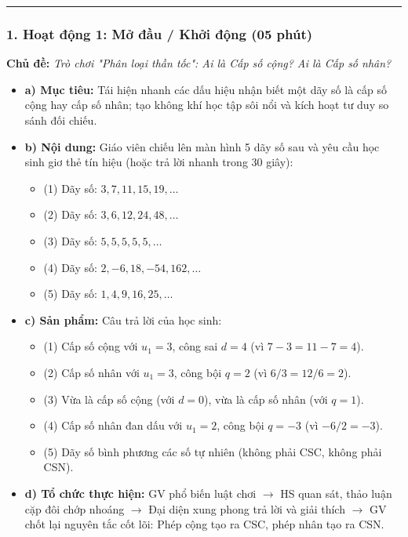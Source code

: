 \documentclass[12pt, a4paper]{article}
\begin{document}
\vspace{0.8em}
\hrule
\vspace{0.8em}

\subsubsection*{1. Hoạt động 1: Mở đầu / Khởi động (05 phút)}
\textbf{Chủ đề:} \textit{Trò chơi "Phân loại thần tốc": Ai là Cấp số cộng? Ai là Cấp số nhân?}
\begin{itemize}
    \item \textbf{a) Mục tiêu:} Tái hiện nhanh các dấu hiệu nhận biết một dãy số là cấp số cộng hay cấp số nhân; tạo không khí học tập sôi nổi và kích hoạt tư duy so sánh đối chiếu.
    \item \textbf{b) Nội dung:} Giáo viên chiếu lên màn hình 5 dãy số sau và yêu cầu học sinh giơ thẻ tín hiệu (hoặc trả lời nhanh trong 30 giây):
    \begin{itemize}
        \item (1) Dãy số: $3, 7, 11, 15, 19, \dots$
        \item (2) Dãy số: $3, 6, 12, 24, 48, \dots$
        \item (3) Dãy số: $5, 5, 5, 5, 5, \dots$
        \item (4) Dãy số: $2, -6, 18, -54, 162, \dots$
        \item (5) Dãy số: $1, 4, 9, 16, 25, \dots$
    \end{itemize}
    \item \textbf{c) Sản phẩm:} Câu trả lời của học sinh:
    \begin{itemize}
        \item (1) Cấp số cộng với $u_1 = 3$, công sai $d = 4$ (vì $7 - 3 = 11 - 7 = 4$).
        \item (2) Cấp số nhân với $u_1 = 3$, công bội $q = 2$ (vì $6/3 = 12/6 = 2$).
        \item (3) Vừa là cấp số cộng (với $d = 0$), vừa là cấp số nhân (với $q = 1$).
        \item (4) Cấp số nhân đan dấu với $u_1 = 2$, công bội $q = -3$ (vì $-6/2 = -3$).
        \item (5) Dãy số bình phương các số tự nhiên (không phải CSC, không phải CSN).
    \end{itemize}
    \item \textbf{d) Tổ chức thực hiện:} GV phổ biến luật chơi $\to$ HS quan sát, thảo luận cặp đôi chớp nhoáng $\to$ Đại diện xung phong trả lời và giải thích $\to$ GV chốt lại nguyên tắc cốt lõi: Phép cộng tạo ra CSC, phép nhân tạo ra CSN.
\end{itemize}
\end{document}
